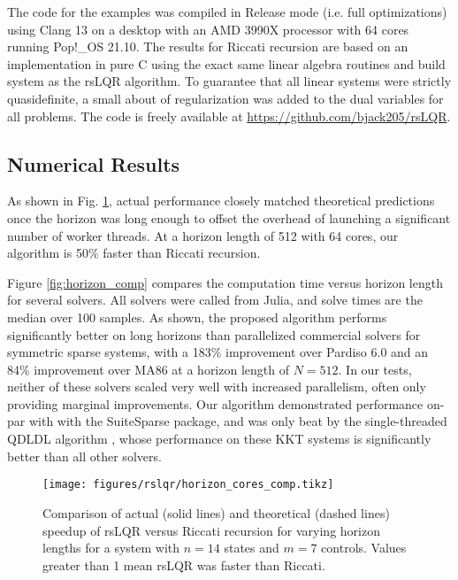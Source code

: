 \documentclass[../root.tex]{subfiles}
\newcommand{\0}{{\transparent{0} \resizebox{\mycellheight}{\mycellheight}{0}}}
\begin{document}
The code for the examples was compiled in Release mode (i.e. full optimizations) using Clang
13 on a desktop with an AMD 3990X processor with 64 cores running Pop!\_OS 21.10. The
results for Riccati recursion are based on an implementation in pure C using the exact same
linear algebra routines and build system as the rsLQR algorithm. To guarantee that all
linear systems were strictly quasidefinite, a small about of regularization was added to the
dual variables for all problems. The code is freely available at 
\url{https://github.com/bjack205/rsLQR}.

\subsection{Numerical Results}
As shown in Fig. \ref{fig:actual_vs_theoretical}, actual performance closely matched theoretical predictions once the horizon was long
enough to offset the overhead of launching a significant number of worker threads.  At a
horizon length of 512 with 64 cores, our algorithm is 50\% faster than Riccati recursion.

Figure \ref{fig:horizon_comp} compares the computation time versus horizon length for
several solvers. All solvers were called from Julia, and solve times are the median over 100
samples. As shown, the proposed algorithm performs significantly better on long horizons
than parallelized commercial solvers for symmetric sparse systems, with a 183\% improvement
over Pardiso 6.0 \cite{schenk_PARDISO_2011} and an 84\% improvement over MA86
\cite{hogg_Indefinite_2010} at a horizon length of $N = 512$.  In our tests, neither of these
solvers scaled very well with increased parallelism, often only providing marginal
improvements. Our algorithm demonstrated performance on-par with with the SuiteSparse
package, and was only beat by the single-threaded QDLDL algorithm \cite{stellato_OSQP_2020},
whose performance on these KKT systems is significantly better than all other solvers.

\begin{figure}
    \centering
    \texttt{[image: figures/rslqr/horizon\_cores\_comp.tikz]}
    \caption{Comparison of actual (solid lines) and theoretical (dashed lines) speedup of 
    rsLQR versus Riccati recursion for varying horizon lengths for a system with $n=14$ 
    states and $m=7$ controls. Values greater than 1 mean 
    rsLQR was faster than Riccati.}
    \label{fig:actual_vs_theoretical}
\end{figure}
\end{document}

